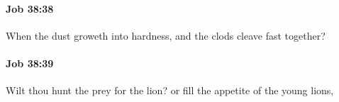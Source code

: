 		\paragraph{Job 38:38} %
			\label{JOB-38-38}

			When the dust groweth into hardness, and the clods cleave fast together?


		\paragraph{Job 38:39} %
			\label{JOB-38-39}

			Wilt thou hunt the prey for the lion? or fill the appetite of the young lions,


